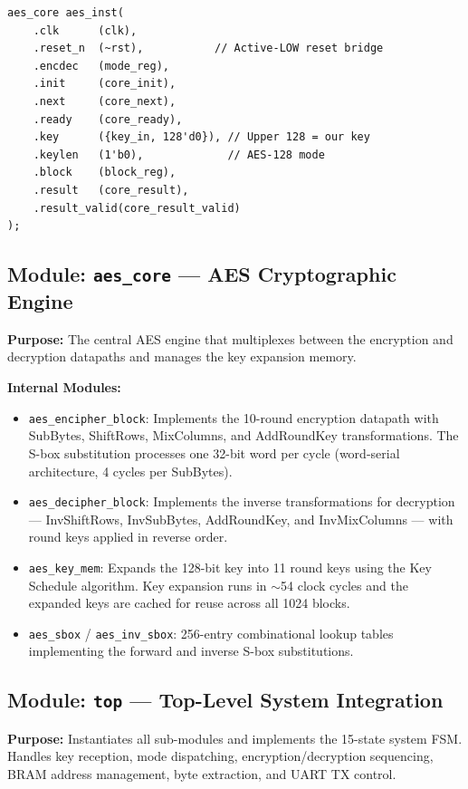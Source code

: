 \documentclass[12pt,a4paper]{article}
\begin{document}
\begin{lstlisting}
aes_core aes_inst(
    .clk      (clk),
    .reset_n  (~rst),           // Active-LOW reset bridge
    .encdec   (mode_reg),
    .init     (core_init),
    .next     (core_next),
    .ready    (core_ready),
    .key      ({key_in, 128'd0}), // Upper 128 = our key
    .keylen   (1'b0),             // AES-128 mode
    .block    (block_reg),
    .result   (core_result),
    .result_valid(core_result_valid)
);
\end{lstlisting}

\subsection{Module: \texttt{aes\_core} — AES Cryptographic Engine}

\textbf{Purpose:} The central AES engine that multiplexes between the encryption and decryption datapaths and manages the key expansion memory.

\textbf{Internal Modules:}
\begin{itemize}
    \item \texttt{aes\_encipher\_block}: Implements the 10-round encryption datapath with SubBytes, ShiftRows, MixColumns, and AddRoundKey transformations. The S-box substitution processes one 32-bit word per cycle (word-serial architecture, 4 cycles per SubBytes).
    
    \item \texttt{aes\_decipher\_block}: Implements the inverse transformations for decryption — InvShiftRows, InvSubBytes, AddRoundKey, and InvMixColumns — with round keys applied in reverse order.
    
    \item \texttt{aes\_key\_mem}: Expands the 128-bit key into 11 round keys using the Key Schedule algorithm. Key expansion runs in $\sim$54 clock cycles and the expanded keys are cached for reuse across all 1024 blocks.
    
    \item \texttt{aes\_sbox} / \texttt{aes\_inv\_sbox}: 256-entry combinational lookup tables implementing the forward and inverse S-box substitutions.
\end{itemize}

\subsection{Module: \texttt{top} — Top-Level System Integration}

\textbf{Purpose:} Instantiates all sub-modules and implements the 15-state system FSM. Handles key reception, mode dispatching, encryption/decryption sequencing, BRAM address management, byte extraction, and UART TX control.
\end{document}
